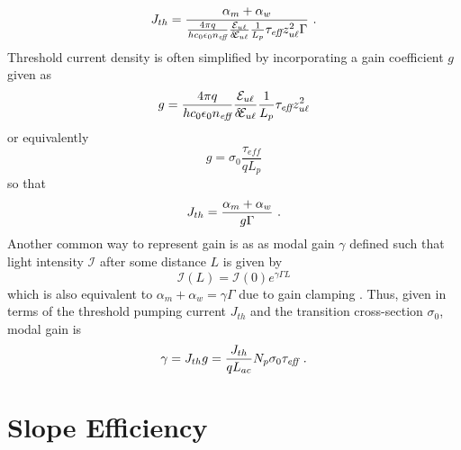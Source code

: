 {\begin{equation}
J_{th} = \frac{\alpha_m + \alpha_w}{\frac{4 \pi q}{h c_0 \epsilon_0 n_\textit{eff}} \frac{\EE_{u\ell}}{\delta\!\EE_{u\ell}} \frac{1}{L_p} \tau_\textit{eff} z_{u\ell}^2 \Gamma} \tn{~.}
\end{equation}
Threshold current density is often simplified by incorporating a gain coefficient $g$  given as
\begin{equation}
g = \frac{4 \pi q}{h c_0 \epsilon_0 n_\textit{eff}} \frac{\EE_{u\ell}}{\delta\!\EE_{u\ell}} \frac{1}{L_p} \tau_\textit{eff} z_{u\ell}^2
\end{equation}
or equivalently
\begin{equation}
g = \sigma_0 \frac{\tau_\textit{eff}}{q L_p}
\end{equation}
so that
\begin{equation}
J_{th} = \frac{\alpha_m + \alpha_w}{g \Gamma} \textnormal{~.}
\end{equation}
Another common way to represent gain is as as modal gain $\gamma$  defined such that light intensity $\mathcal{I}$ after some distance $L$ is given by
\begin{equation}
\mathcal{I}(L) = \mathcal{I}(0) e^{\gamma \Gamma L}
\end{equation}
which is also equivalent to $\alpha_m+\alpha_w=\gamma \Gamma$ due to gain clamping \cite{SalehTeich:book:1991}.  Thus, given in terms of the threshold pumping current $J_{th}$ and the transition cross-section $\sigma_0$, modal gain is
\begin{equation}
\gamma = J_{th} g = \frac{J_{th}}{q L_{ac}} N_p \sigma_0 \tau_\textit{eff} \textnormal{~.}
\end{equation}



\section{Slope Efficiency}

}
